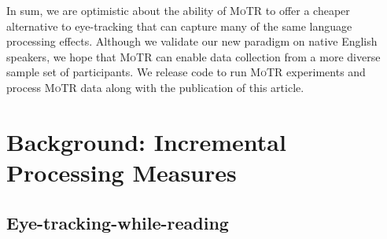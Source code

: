\documentclass[12pt]{article}
\newcommand{\motr}{\textsc{MoTR}\xspace}
\begin{document}
In sum, we are optimistic about the ability of \motr to offer a cheaper alternative to eye-tracking that can capture many of the same language processing effects. Although we validate our new paradigm on native English speakers, we hope that \motr can enable data collection from a more diverse sample set of participants. We release code to run \motr experiments and process \motr data along with the publication of this article.


\section{Background: Incremental Processing Measures}


\subsection{Eye-tracking-while-reading}
\end{document}
